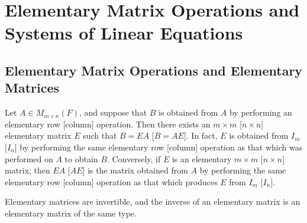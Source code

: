 \section{Elementary Matrix Operations and Systems of Linear Equations}
\subsection{Elementary Matrix Operations and Elementary Matrices}
\begin{theorem}
    Let \( A \in M_{m \times n}(F) \), and suppose that \( B \) is obtained from \( A \) by performing an elementary row [column] operation. Then there exists an \( m \times m \) [\( n \times n \)] elementary matrix \( E \) such that \( B = EA \) [\( B = AE \)]. In fact, \( E \) is obtained from \( I_m \) [\( I_n \)] by performing the same elementary row [column] operation as that which was performed on \( A \) to obtain \( B \). Conversely, if \( E \) is an elementary \( m \times m \) [\( n \times n \)] matrix, then \( EA \) [\( AE \)] is the matrix obtained from \( A \) by performing the same elementary row [column] operation as that which produces \( E \) from \( I_m \) [\( I_n \)].
\end{theorem}

\begin{theorem}
    Elementary matrices are invertible, and the inverse of an elementary matrix is an elementary matrix of the same type.
\end{theorem}

